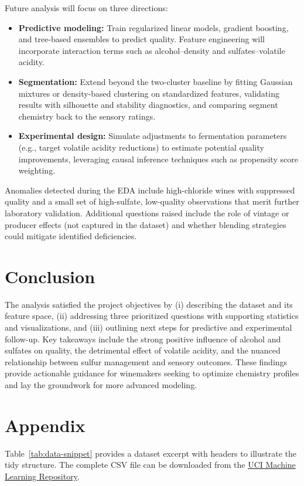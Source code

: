 \documentclass[11pt]{article}
\begin{document}
Future analysis will focus on three directions:
\begin{itemize}
  \item \textbf{Predictive modeling:} Train regularized linear models, gradient boosting, and tree-based ensembles to predict quality. Feature engineering will incorporate interaction terms such as alcohol--density and sulfates--volatile acidity.
  \item \textbf{Segmentation:} Extend beyond the two-cluster baseline by fitting Gaussian mixtures or density-based clustering on standardized features, validating results with silhouette and stability diagnostics, and comparing segment chemistry back to the sensory ratings.
  \item \textbf{Experimental design:} Simulate adjustments to fermentation parameters (e.g., target volatile acidity reductions) to estimate potential quality improvements, leveraging causal inference techniques such as propensity score weighting.
\end{itemize}

Anomalies detected during the EDA include high-chloride wines with suppressed
quality and a small set of high-sulfate, low-quality observations that merit
further laboratory validation. Additional questions raised include the role of
vintage or producer effects (not captured in the dataset) and whether blending
strategies could mitigate identified deficiencies.

\section{Conclusion}
The analysis satisfied the project objectives by (i) describing the dataset and
its feature space, (ii) addressing three prioritized questions with supporting
statistics and visualizations, and (iii) outlining next steps for predictive and
experimental follow-up. Key takeaways include the strong positive influence of
alcohol and sulfates on quality, the detrimental effect of volatile acidity,
and the nuanced relationship between sulfur management and sensory outcomes.
These findings provide actionable guidance for winemakers seeking to optimize
chemistry profiles and lay the groundwork for more advanced modeling.

\section*{Appendix}
Table~\ref{tab:data-snippet} provides a dataset excerpt with headers to
illustrate the tidy structure. The complete CSV file can be downloaded from the
\href{https://archive.ics.uci.edu/dataset/186/wine+quality}{UCI Machine Learning Repository}.
\end{document}
